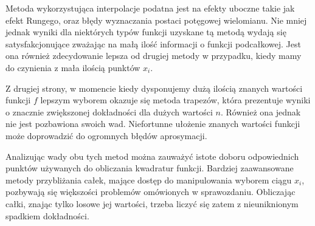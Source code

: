 \documentclass[11pt,wide,leqno]{article}
\begin{document}
        Metoda wykorzystująca interpolacje podatna jest na efekty uboczne takie jak efekt Rungego, oraz 
        błędy wyznaczania postaci potęgowej wielomianu. Nie mniej jednak wyniki dla niektórych typów funkcji uzyskane tą metodą 
        wydają się satysfakcjonujące zważając na małą ilość informacji o funkcji podcałkowej. Jest ona również zdecydowanie lepsza od drugiej metody
        w przypadku, kiedy mamy do czynienia z mała ilością punktów \(x_i\).  

        Z drugiej strony, w momencie kiedy dysponujemy dużą ilością znanych wartości funkcji \(f\)
        lepszym wyborem okazuje się metoda trapezów, która prezentuje wyniki o znacznie zwiększonej dokładności dla dużych wartości \(n\).
        Również ona jednak nie jest pozbawiona swoich wad. Niefortunne ułożenie znanych wartości funkcji może doprowadzić do 
        ogromnych błędów aprosymacji. 
        
        Analizując wady obu tych metod można zauważyć istote doboru odpowiednich punktów używanych do obliczania kwadratur 
        funkcji. Bardziej zaawansowane metody przybliżania całek, mające dostęp do manipulowania wyborem ciągu \(x_i\), pozbywają się 
        większości problemów omówionych w sprawozdaniu. Obliczając całki, znając tylko losowe jej wartości, trzeba 
        liczyć się zatem z nieuniknionym spadkiem dokładności.
\end{document}
